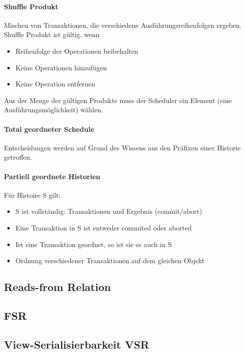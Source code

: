 \documentclass[ngerman]{scrartcl}
\begin{document}
\paragraph*{Shuffle Produkt} Mischen von Transaktionen, die verschiedene Ausführungsreihenfolgen ergeben. Shuffle Produkt ist gültig, wenn 
\begin{itemize}
  \item Reihenfolge der Operationen beibehalten
  \item Keine Operationen hinzufügen
  \item Keine Operation entfernen
\end{itemize} 
Aus der Menge der gültigen Produkte muss der Scheduler ein Element (eine Ausführungsmöglichkeit) wählen.

\paragraph*{Total geordneter Schedule}
Entscheidungen werden auf Grund des Wissens aus den Präfixen einer Historie getroffen.

\paragraph*{Partiell geordnete Historien}
Für Histoire S gilt:
\begin{itemize}
  \item S ist vollständig: Transaktionen und Ergebnis (commit/abort)
  \item Eine Transaktion in S ist entweder commited oder aborted
  \item Ist eine Transaktion geordnet, so ist sie es auch in S
  \item Ordnung verschiedener Transaktionen auf dem gleichen Objekt
\end{itemize}

\subsection{ Reads-from Relation}

\subsection{ FSR}

\subsection{View-Serialisierbarkeit VSR}
\end{document}
